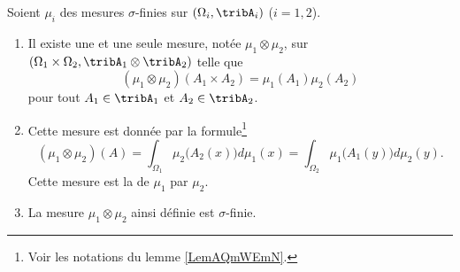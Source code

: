 \begin{theorem}   \label{ThoWWAjXzi}
    Soient \( \mu_i\) des mesures $\sigma$-finies sur \( (\Omega_i,\tribA_i)\) (\( i=1,2\)). 
    \begin{enumerate}
        \item
            
    Il existe une et une seule mesure, notée \( \mu_1\otimes \mu_2\), sur \( (\Omega_1\times\Omega_2,\tribA_1\otimes\tribA_2)\) telle que
    \begin{equation}    \label{EqOIuWLQU}
        (\mu_1\otimes\mu_2)(A_1\times A_2)=\mu_1(A_1)\mu_2(A_2)
    \end{equation}
    pour tout \( A_1\in \tribA_1\) et \( A_2\in\tribA_2\). 
\item
    Cette mesure est donnée par la formule\footnote{Voir les notations du lemme \ref{LemAQmWEmN}.}
    \begin{equation}   \label{EqDFxuGtH}
        (\mu_1\otimes \mu_2)(A)=\int_{\Omega_1}\mu_2\big( A_2(x) \big)d\mu_1(x)=\int_{\Omega_2}\mu_1\big( A_1(y) \big)d\mu_2(y).
    \end{equation}
    Cette mesure est la  de \( \mu_1\) par \( \mu_2\).
\item
    La mesure \( \mu_1\otimes \mu_2\) ainsi définie est \( \sigma\)-finie.
    \end{enumerate}
\end{theorem}

